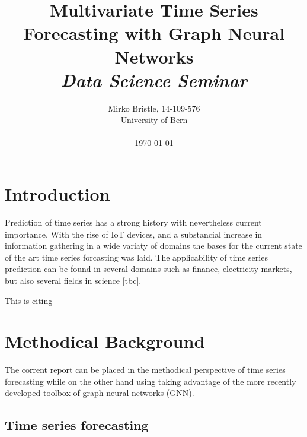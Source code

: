 \documentclass[letterpaper,twocolumn,11pt]{article}
\begin{document}
\title{\Large \bf Multivariate Time Series Forecasting with Graph Neural Networks \\
 \Medium \it Data Science Seminar
}

\author{
{\rm Mirko Bristle, 14-109-576}\\
    University of Bern \\
    \\
    \today
}
\maketitle


%

\section{Introduction}

Prediction of time series has a strong history with nevertheless current importance. With the rise of IoT devices, and a substancial
increase in information gathering in a wide variaty of domains the bases for the current state of the art time series forcasting was laid.
The applicability of time series prediction can be found in several domains such as finance, electricity markets, but also several fields in science [tbc].



This is citing  \cite{wu2020connecting}


\section{Methodical Background}
The corrent report can be placed in the methodical perspective of time series forecasting while on the other hand using
taking advantage of the more recently developed toolbox of graph neural networks (GNN).
\subsection{Time series forecasting}
\end{document}
